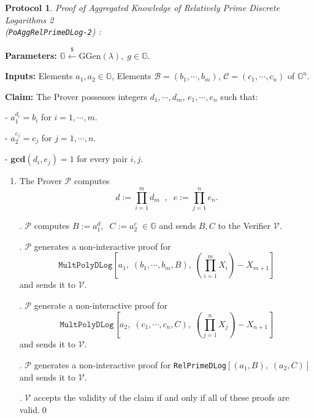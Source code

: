 \documentclass[11pt, lettersize, notitlepage, leqno, footskip=0.6cm]{article}
\newcommand{\pl}{\prod\limits}
\newcommand{\ttt}{\texttt}
\newcommand{\mc}{\mathcal}
\newcommand{\mb}{\mathbb}
\newcommand{\mbf}{\mathbf}
\newcommand{\mr}{\mathrm}
\newcommand{\lamb}{\lambda}
\newcommand{\vs}{\vspace{-0.15cm}}
\newcommand{\noin}{\noindent}
\newcommand{\GCD}{\mbf{gcd}}
\newtheorem{Prot}[Thm]{Protocol}
\numberwithin{equation}{section}
\begin{document}
\vspace{0.1cm}

\begin{Prot} \normalfont \textit{Proof of Aggregated Knowledge of Relatively Prime Discrete Logarithms 2}\\ (\verb|PoAggRelPrimeDLog-2|) :\end{Prot}\vspace{-0.3cm}

\noindent \textbf{Parameters:} $\mb{G}\xleftarrow{\$} \mr{GGen}(\lamb), \; g\in \mb{G}$.

\noindent \textbf{Inputs:} Elements $a_1, a_2\in \mb{G}$, Elements $\mc{B} = (b_1,\cdots, b_m)$, $\mc{C} = (c_1,\cdots, c_n)$ of $\mb{G}^n$.

\noindent \textbf{Claim:} The Prover possesses integers $d_1,\cdots, d_m$,\; $e_1,\cdots,e_n$ such that:

\noindent - $a_1^{d_i} = b_i$ for $i = 1,\cdots, m$.

\noindent - $a_2^{e_j} = c_j$ for $j = 1,\cdots, n$.

\noindent - $\GCD(d_i, e_j) = 1$ for every pair $i, j$.


\begin{enumerate}[wide, labelwidth=!, labelindent=0pt]\vs \item The Prover $\mc{P}$ computes \vs $${d}:= \pl_{i=1}^m d_m\;\;,\;\; {e}:= \pl_{j=1}^n e_n.$$

. $\mc{P}$ computes $B:= a_1^{d},\;\;C:= a_2^{e}\;\in\mb{G}$ and sends $B, C$ to the Verifier $\mc{V}$.

. $\mc{P}$ generates a non-interactive proof for \vs $$\ttt{MultPolyDLog}[a_1,\;(b_1,\cdots,b_m, B),\; (\pl_{i=1}^m X_i) -X_{m+1}]$$ and sends it to $\mc{V}$.

\noin 4. $\mc{P}$ generate a non-interactive proof for \vs $$ \ttt{MultPolyDLog}[a_2,\;(c_1,\cdots,c_n, C),\; (\pl_{j=1}^n X_j) -X_{n+1}]$$ and sends it to $\mc{V}$.


. $\mc{P}$ generates a non-interactive proof for \verb|RelPrimeDLog|$[(a_1, B),\;(a_2, C)]$ and sends it to $\mc{V}$. 

. $\mc{V}$ accepts the validity of the claim if and only if all of these proofs are valid.\qed \end{enumerate}
\end{document}
